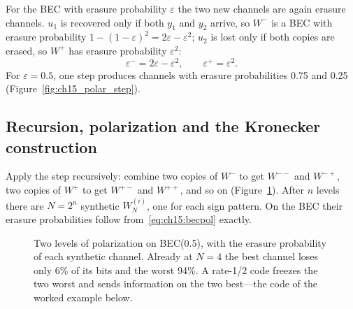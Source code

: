 For the BEC with erasure probability $\varepsilon$ the two new channels are again erasure channels.
$u_1$ is recovered only if both $y_1$ and $y_2$ arrive, so $W^-$ is a BEC with erasure probability
$1-(1-\varepsilon)^2=2\varepsilon-\varepsilon^2$; $u_2$ is lost only if both copies are erased, so
$W^+$ has erasure probability $\varepsilon^2$:
\begin{equation}
\varepsilon^-=2\varepsilon-\varepsilon^2,\qquad\varepsilon^+=\varepsilon^2.
\label{eq:ch15:becpol}
\end{equation}
For $\varepsilon=0.5$, one step produces channels with erasure probabilities 0.75 and 0.25
(Figure~\ref{fig:ch15_polar_step}).

\subsection{Recursion, polarization and the Kronecker construction}

Apply the step recursively: combine two copies of $W^-$ to get $W^{--}$ and $W^{-+}$, two copies of
$W^+$ to get $W^{+-}$ and $W^{++}$, and so on (Figure~\ref{fig:ch15_poltree}). After $n$ levels there
are $N=2^n$ synthetic  $W_N^{(i)}$, one for each sign pattern. On the BEC their
erasure probabilities follow from~\eqref{eq:ch15:becpol} exactly.

\begin{figure}[htbp]\centering
{}
\caption{Two levels of polarization on BEC(0.5), with the erasure probability of each synthetic
channel. Already at $N=4$ the best channel loses only 6\% of its bits and the worst 94\%. A rate-1/2
code freezes the two worst and sends information on the two best---the code of the worked example
below.}
\label{fig:ch15_poltree}
\end{figure}

